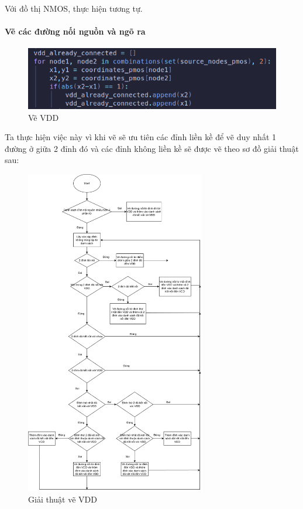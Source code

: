\documentclass[a4paper,12pt]{article}
\begin{document}
Với đồ thị NMOS, thực hiện tương tự.

\paragraph{Vẽ các đường nối nguồn và ngõ ra}

\begin{figure}[H]
    \centering
    \includegraphics[width=1\textwidth]{../PNG/VDD.png}
    \caption{Vẽ VDD}
    \label{fig:VDD}
\end{figure}

Ta thực hiện việc này vì khi vẽ sẽ ưu tiên các đỉnh liền kề để vẽ duy nhất 1 đường ở giữa 2 đỉnh đó và 
các đỉnh không liền kề sẽ được vẽ theo sơ đồ giải thuật sau:

\begin{figure}[H]
    \centering
    \includegraphics[width=0.7\textwidth]{../PNG/Algorithm_VDD.png}
    \caption{Giải thuật vẽ VDD}
    \label{fig:VDD_Algorithm}
\end{figure}
\end{document}
